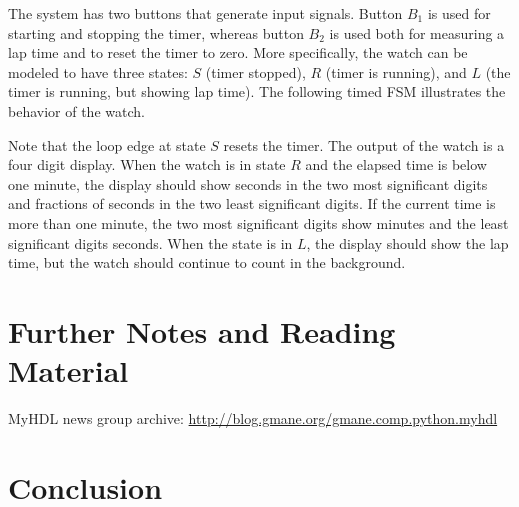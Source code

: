 \documentclass[a4paper, conference]{IEEEtran}
\newcommand{\comment}[3]{\paragraph*{\textbf{#1}}{\color{#3}#2}}
\newcommand{\martin}[1]{\comment{Martin}{#1}{Blue}}
\begin{document}
The system has two buttons that generate input signals. Button $B_1$
is used for starting and stopping the timer, whereas button $B_2$ is
used both for measuring a lap time and to reset the timer to zero. More
specifically, the watch can be modeled to have three states: $S$
(timer stopped), $R$ (timer is running), and $L$ (the timer is
running, but showing lap time). The following timed FSM illustrates
the behavior of the watch.\\



Note that the loop edge at state $S$ resets the timer. The output
of the watch is a four digit display. When the watch is in state
$R$ and the elapsed time is below one minute, the display should show
seconds in the two most significant digits and fractions of seconds in
the two least significant digits. If the current time is more than one
minute, the two most significant digits show minutes and the least
significant digits seconds. When the state is in $L$, the display
should show the lap time, but the watch should continue to count in
the background.


\section{Further Notes and Reading Material}

MyHDL news group archive: \url{http://blog.gmane.org/gmane.comp.python.myhdl}


% 



\section{Conclusion}
\label{sec:conclusion}
\end{document}
